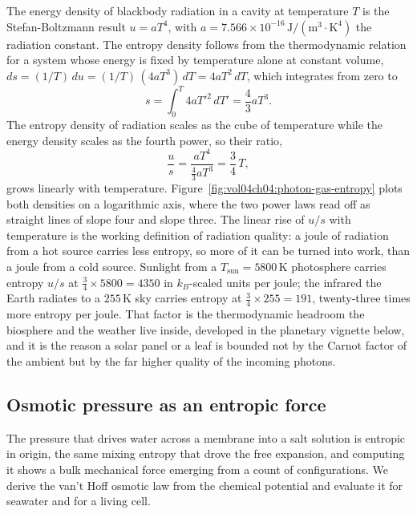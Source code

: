 The energy density of blackbody radiation in a cavity at temperature $T$ is the
Stefan-Boltzmann result $u = a T^4$, with $a = 7.566\times10^{-16}\,\text{J}/
(\text{m}^3\cdot\text{K}^4)$ the radiation constant. The entropy density follows
from the thermodynamic relation for a system whose energy is fixed by temperature
alone at constant volume, $ds = (1/T)\,du = (1/T)\,(4 a T^3)\,dT = 4 a T^2\,dT$,
which integrates from zero to
\[
s = \int_0^T 4 a T'^2\,dT' = \frac{4}{3} a T^3.
\]
The entropy density of radiation scales as the cube of temperature while the
energy density scales as the fourth power, so their ratio,
\[
\frac{u}{s} = \frac{a T^4}{\tfrac43 a T^3} = \frac{3}{4}\,T,
\]
grows linearly with temperature. Figure~\ref{fig:vol04ch04:photon-gas-entropy}
plots both densities on a logarithmic axis, where the two power laws read off as
straight lines of slope four and slope three. The linear rise of $u/s$ with
temperature is the working definition of radiation quality: a joule of radiation
from a hot source carries less entropy, so more of it can be turned into work,
than a joule from a cold source. Sunlight from a $T_{\text{sun}} = 5800\,
\si{\kelvin}$ photosphere carries entropy $u/s$ at $\tfrac34\times 5800 = 4350$
in $k_B$-scaled units per joule; the infrared the Earth radiates to a $255\,
\si{\kelvin}$ sky carries entropy at $\tfrac34\times 255 = 191$, twenty-three
times more entropy per joule. That factor is the thermodynamic headroom the
biosphere and the weather live inside, developed in the planetary vignette below,
and it is the reason a solar panel or a leaf is bounded not by the Carnot factor
of the ambient but by the far higher quality of the incoming photons.



\subsection{Osmotic pressure as an entropic force}

The pressure that drives water across a membrane into a salt solution is entropic
in origin, the same mixing entropy that drove the free expansion, and computing it
shows a bulk mechanical force emerging from a count of configurations. We derive
the van't Hoff osmotic law from the chemical potential and evaluate it for
seawater and for a living cell.

